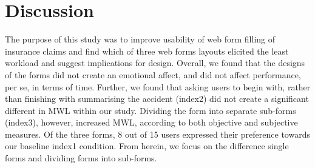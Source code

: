 \documentclass[../main/Replicate.tex]{subfiles}
\begin{document}
\section{Discussion}
	The purpose of this study was to improve usability of web form filling of insurance claims and find which of three web forms layouts elicited the least workload and suggest implications for design. Overall, we found that the designs of the forms did not create an emotional affect, and did not affect performance, per se, in terms of time. Further, we found that asking users to begin with, rather than finishing with summarising the accident (index2) did not create a significant different in MWL within our study. Dividing the form into separate sub-forms (index3), however, increased MWL, according to both objective and subjective measures. Of the three forms, 8 out of 15 users expressed their preference towards our baseline index1 condition. From herein, we focus on the difference single forms and dividing forms into sub-forms. 
\end{document}
